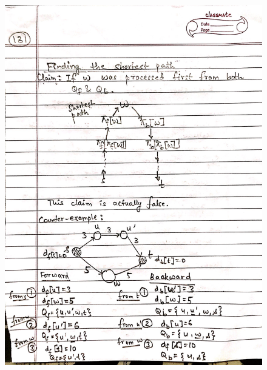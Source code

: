 \begin{figure}[H]
    \centering
    \includegraphics[scale=0.25]{"./MIT-6.006/MIT-6006-131"}
\end{figure}
\newpage

